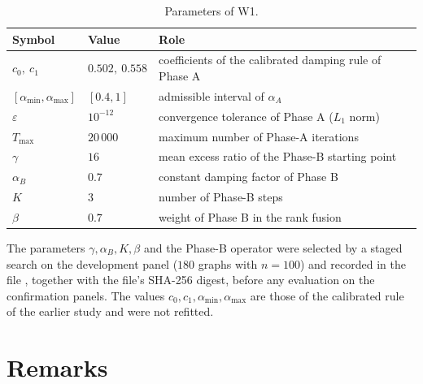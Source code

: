 \documentclass[11pt,a4paper]{article}
\newcommand{\Czero}{0.502}
\newcommand{\Cone}{0.558}
\newcommand{\Amin}{0.4}
\newcommand{\Amax}{1}
\newcommand{\Tol}{10^{-12}}
\newcommand{\Tmax}{20\,000}
\newcommand{\Gam}{16}
\newcommand{\AB}{0.7}
\newcommand{\KB}{3}
\newcommand{\Beta}{0.7}
\begin{document}
\begin{table}[H]
\centering
\caption{Parameters of W1.}\label{tab:params}
\small
\begin{tabular}{@{}l l l@{}}
\toprule
Symbol & Value & Role \\
\midrule
$c_0,\ c_1$ & $\Czero,\ \Cone$ & coefficients of the calibrated damping rule of Phase A \\
$[\alpha_{\min},\alpha_{\max}]$ & $[\Amin,\Amax]$ & admissible interval of $\alpha_A$ \\
$\varepsilon$ & $\Tol$ & convergence tolerance of Phase A ($L_1$ norm) \\
$T_{\max}$ & $\Tmax$ & maximum number of Phase-A iterations \\
$\gamma$ & $\Gam$ & mean excess ratio of the Phase-B starting point \\
$\alpha_B$ & $\AB$ & constant damping factor of Phase B \\
$K$ & $\KB$ & number of Phase-B steps \\
$\beta$ & $\Beta$ & weight of Phase B in the rank fusion \\
\bottomrule
\end{tabular}
\end{table}

The parameters $\gamma,\alpha_B,K,\beta$ and the Phase-B operator were selected by a staged search on the development panel ($180$ graphs with $n=100$) and recorded in the file , together with the file's SHA-256 digest, before any evaluation on the confirmation panels. The values $c_0,c_1,\alpha_{\min},\alpha_{\max}$ are those of the calibrated rule of the earlier study and were not refitted.

\section{Remarks}
\end{document}
